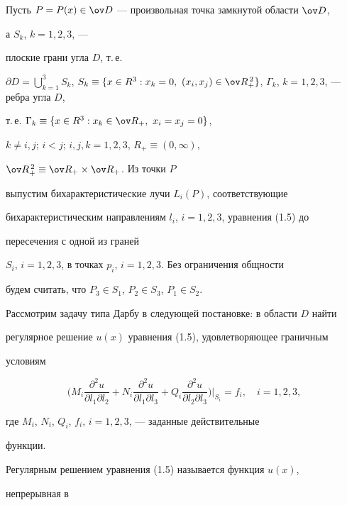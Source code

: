 Пусть $P=P(x)\in\ov D$ --- произвольная точка замкнутой области $\ov D$,


а $S_k$, $k=1,2,3$, ---


плоские грани угла $D$, т.\,е.


$\partial D=\bigcup\limits^3_{k=1}S_k$, $S_k\equiv\{x\in R^3:x_k=0,\


(x_i,x_j)\in\ov R^{\,2}_+\}$, $\Gamma_k$, $k=1,2,3$, --- ребра угла $D$,


т.\,е. $\Gamma_k\equiv\{x\in R^3:x_k\in\ov R_+,\ x_i=x_j=0\}$,


$k\ne i,j$; $i<j$; $i,j,k=1,2,3$, $R_+\equiv(0,\infty)$,


$\ov R^{\,2}_+\equiv\ov R_+\times\ov R_+$. Из точки $P$


выпустим бихарактеристические лучи $L_i(P)$, соответствующие


бихарактеристическим направлениям $l_i$, $i=1,2,3$, уравнения (1.5) до


пересечения с одной из граней


$S_i$, $i=1,2,3$, в точках $p_i$, $i=1,2,3$. Без ограничения общности


будем считать, что $P_3\in S_1$, $P_2\in S_3$, $P_1\in S_2$.





Рассмотрим задачу типа Дарбу в следующей постановке: в области $D$ найти


регулярное решение $u(x)$ уравнения (1.5), удовлетворяющее граничным


условиям


\begin{equation}


\biggl(M_i\frac{\partial^2u}{\partial l_1\partial l_2}+


N_i\frac{\partial^2u}{\partial l_1\partial l_3}+


Q_i\frac{\partial^2u}{\partial l_2\partial l_3}\biggr)


\biggr|_{S_i}=f_i,\quad i=1,2,3,


\end{equation}


где $M_i$, $N_i$, $Q_i$, $f_i$, $i=1,2,3$, --- заданные действительные


функции.





Регулярным решением уравнения (1.5) называется функция $u(x)$,


непрерывная в


